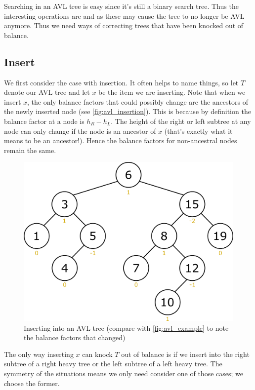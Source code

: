 Searching in an AVL tree is easy since it's still a binary search tree. Thus the interesting operations are  and  as these may cause the tree to no longer be AVL anymore. Thus we need ways of correcting trees that have been knocked out of balance.

\subsection{Insert}
We first consider the case with insertion. It often helps to name things, so let $T$ denote our AVL tree and let $x$ be the item we are inserting. Note that when we insert $x$, the only balance factors that could possibly change are the ancestors of the newly inserted node (see \autoref{fig:avl_insertion}). This is because by definition the balance factor at a node is $h_R - h_L$. The height of the right or left subtree at any node can only change if the node is an ancestor of $x$ (that's exactly what it means to be an ancestor!). Hence the balance factors for non-ancestral nodes remain the same.

\begin{figure}[h]
    \centering
    \includegraphics[scale=0.25]{Images/avl_insertion.png}
    \caption{Inserting into an AVL tree (compare with \autoref{fig:avl_example} to note the balance factors that changed)}
    \label{fig:avl_insertion}
\end{figure}

The only way inserting $x$ can knock $T$ out of balance is if we insert into the right subtree of a right heavy tree or the left subtree of a left heavy tree. The symmetry of the situations means we only need consider one of those cases; we choose the former.


